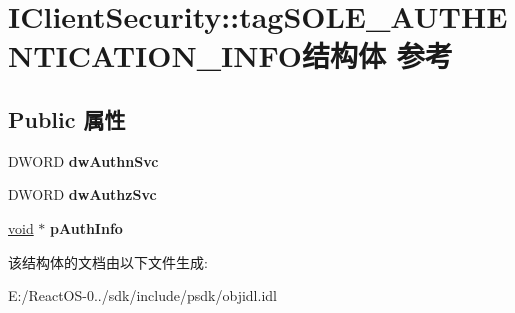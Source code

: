 \hypertarget{struct_i_client_security_1_1tag_s_o_l_e___a_u_t_h_e_n_t_i_c_a_t_i_o_n___i_n_f_o}{}\section{I\+Client\+Security\+:\+:tag\+S\+O\+L\+E\+\_\+\+A\+U\+T\+H\+E\+N\+T\+I\+C\+A\+T\+I\+O\+N\+\_\+\+I\+N\+F\+O结构体 参考}
\label{struct_i_client_security_1_1tag_s_o_l_e___a_u_t_h_e_n_t_i_c_a_t_i_o_n___i_n_f_o}
\subsection*{Public 属性}
\begin{DoxyCompactItemize}
\item 
\mbox{\label{struct_i_client_security_1_1tag_s_o_l_e___a_u_t_h_e_n_t_i_c_a_t_i_o_n___i_n_f_o_a3e8f2730277a77ea2cf1386175dfd465}} 
D\+W\+O\+RD {\bfseries dw\+Authn\+Svc}
\item 
\mbox{\label{struct_i_client_security_1_1tag_s_o_l_e___a_u_t_h_e_n_t_i_c_a_t_i_o_n___i_n_f_o_a4da1f4fc44dca96a662550f88d5035f2}} 
D\+W\+O\+RD {\bfseries dw\+Authz\+Svc}
\item 
\mbox{\label{struct_i_client_security_1_1tag_s_o_l_e___a_u_t_h_e_n_t_i_c_a_t_i_o_n___i_n_f_o_a64b44b853f301c936841a1c04f3a2391}} 
\hyperlink{interfacevoid}{void} $\ast$ {\bfseries p\+Auth\+Info}
\end{DoxyCompactItemize}


该结构体的文档由以下文件生成\+:\begin{DoxyCompactItemize}
\item 
E\+:/\+React\+O\+S-\/0../sdk/include/psdk/objidl.\+idl\end{DoxyCompactItemize}
